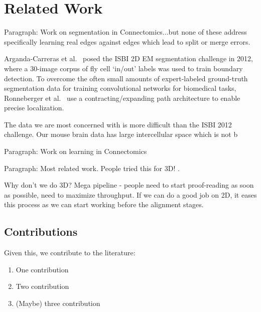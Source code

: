\section{Related Work}

Paragraph: Work on segmentation in Connectomics...but none of these address specifically learning real edges against edges which lead to split or merge errors.

Arganda-Carreras et al.~\cite{10.3389/fnana.2015.00142} posed the ISBI 2D EM segmentation challenge in 2012, where a 30-image corpus of fly cell `in/out' labels was used to train boundary detection. To overcome the often small amounts of expert-labeled ground-truth segmentation data for training convolutional networks for biomedical tasks, Ronneberger et al.~\cite{RonnebergerFB15} use a contracting/expanding path architecture to enable precise localization.

The data we are most concerned with is more difficult than the ISBI 2012 challenge. Our mouse brain data has large intercellular space which is not b

Paragraph: Work on learning in Connectomics

Paragraph: Most related work. People tried this for 3D! \cite{BogovicHJ13}. 

Why don't we do 3D? Mega pipeline - people need to start proof-reading as soon as possible, need to maximize throughput. If we can do a good job on 2D, it eases this process as we can start working before the alignment stages.

\subsection{Contributions}

Given this, we contribute to the literature:
\begin{enumerate}
\item One contribution
\item Two contribution
\item (Maybe) three contribution
\end{enumerate}